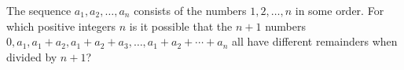 The sequence $a_1, a_2, \dots, a_n$ consists of the numbers $1, 2, \dots, n$ in some order. For which positive integers $n$ is it possible that the $n+1$ numbers $0, a_1, a_1+a_2, a_1+a_2+a_3,\dots, a_1 + a_2 +\cdots + a_n$ all have different remainders when divided by $n + 1$?
